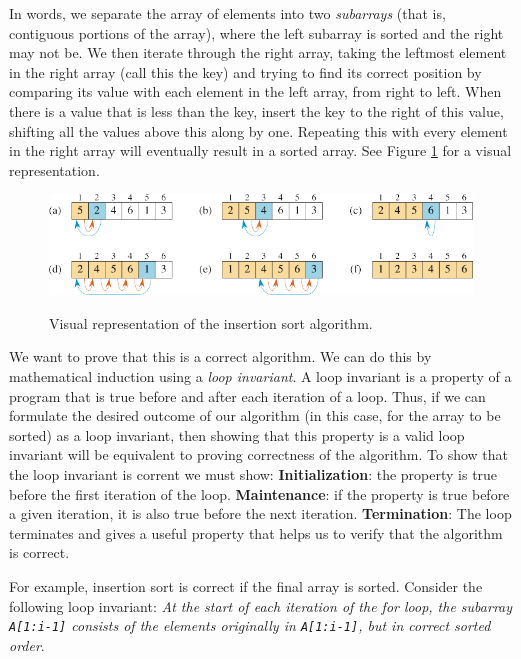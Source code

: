 \documentclass[12pt]{article}
\begin{document}
In words, we separate the array of elements into two \textit{subarrays} (that is, contiguous portions of the array), where the
left subarray is sorted and the right may not be. We then iterate through the right array, taking the leftmost element in
the right array (call this the key) and trying to find its correct position by comparing its value with each element in the left
array, from right to left. When there is a value that is less than the key, insert the key to the right of
this value, shifting all the values above this along by one. Repeating this with every element in the right array
will eventually result in a sorted array. See Figure \ref{Figure: insertion sort} for a visual representation.

\begin{figure}[ht]\centering\label{Figure: insertion sort}
    \includegraphics[angle=0]{Figures/insertion-sort.pdf}
    \caption{Visual representation of the insertion sort algorithm.}
\end{figure}

We want to prove that this is a correct algorithm. We can do this by mathematical induction using a \textit{loop invariant}.
A loop invariant is a property of a program that is true before and after each iteration of a loop. Thus, if we can formulate
the desired outcome of our algorithm (in this case, for the array to be sorted) as a loop invariant, then showing that this property
is a valid loop invariant will be equivalent to proving correctness of the algorithm. To show that the loop invariant is corrent we must
show:
\newline \textbf{Initialization}: the property is true before the first iteration of the loop.
\newline \textbf{Maintenance}: if the property is true before a given iteration, it is also true before the next iteration.
\newline \textbf{Termination}: The loop terminates and gives a useful property that helps us to verify that the algorithm is correct.

For example, insertion sort is correct if the final array is sorted. Consider the following loop invariant:
\newline \textit{At the start of each iteration of the for loop, the subarray \texttt{A[1:i-1]} consists of the elements originally in \texttt{A[1:i-1]},
but in correct sorted order}.
\end{document}
